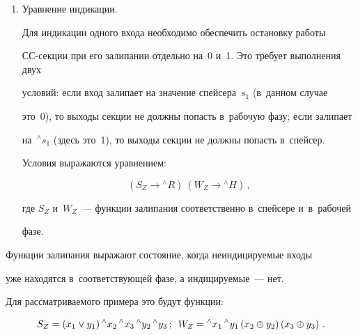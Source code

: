 \begin{enumerate}[1.]
\begin{equation}
   S \to H\,;\qquad


   W \to R\,,


\label{e7-pl}


   \end{equation}


где стрелка означает логическое следование (импликацию).


   \item Уравнение индикации.


   


   Для индикации одного входа необходимо обеспечить остановку работы  


СС-сек\-ции при его залипании отдельно на~0 и~1. Это требует выполнения двух 


условий: если вход залипает на значение спейсера~$s_1$ (в~данном случае 


это~0), то выходы секции не должны попасть в~рабочую фазу; если залипает 


на~${^\wedge s_1}$ (здесь это~1), то выходы секции не должны попасть в~спейсер. 


Условия выражаются уравнением:


   \begin{equation}


   \left(S_Z \to {^\wedge R}\right)\  \left(W_Z\to {^\wedge H}\right)\,,


   \label{e9-pl}


   \end{equation}


где $S_Z$ и~$W_Z$~--- функции залипания соответственно в~спейсере и~в~рабочей 


фазе.


\end{enumerate}





   Функции залипания выражают состояние, когда неиндицируемые входы 


уже находятся в~соответствующей фазе, а индицируемые~--- нет.


   


   Для рассматриваемого примера это будут функции:


   \begin{equation}


   S_Z = \left(x_1 \vee y_1\right) {^\wedge x_2}\, {^\wedge x_3}\, 


   {^\wedge y_2}\, {^\wedge y_3}\,;


\enskip


   W_Z = {^\wedge x_1}\, {^\wedge y_1} \left(x_2 \oplus y_2\right) \left(x_3 


   \oplus y_3\right)\,.


     \label{e10-pl}


   \end{equation}


